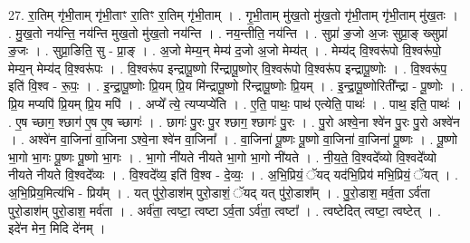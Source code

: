 \documentclass[17pt]{extarticle}
\begin{document}
27. रा॒तिम् गृ॑भी॒ताम् गृ॑भी॒ताꣳ रा॒तिꣳ रा॒तिम् गृ॑भी॒ताम् । . गृ॒भी॒ताम् मु॑ख॒तो मु॑ख॒तो गृ॑भी॒ताम् गृ॑भी॒ताम् मु॑ख॒तः । . मु॒ख॒तो नय॑न्ति॒ नय॑न्ति मुख॒तो मु॑ख॒तो नय॑न्ति । . नय॒न्तीति॒ नय॑न्ति । . सुप्रा॑ ङ॒जो अ॒जः सुप्रा॒ङ् ख्सुप्रा॑ ङ॒जः । . सुप्रा॒ङिति॒ सु - प्रा॒ङ् । . अ॒जो मेम्य॒न् मेम्य॑ द॒जो अ॒जो मेम्य॑त् । . मेम्य॑द् वि॒श्वरू॑पो वि॒श्वरू॑पो॒ मेम्य॒न् मेम्य॑द् वि॒श्वरू॑पः । . वि॒श्वरू॑प इन्द्रापू॒ष्णो रि॑न्द्रापू॒ष्णोर् वि॒श्वरू॑पो वि॒श्वरू॑प इन्द्रापू॒ष्णोः । . वि॒श्वरू॑प॒ इति॑ वि॒श्व - रू॒पः॒ । . इ॒न्द्रा॒पू॒ष्णोः प्रि॒यम् प्रि॒य मि॑न्द्रापू॒ष्णो रि॑न्द्रापू॒ष्णोः प्रि॒यम् । . इ॒न्द्रा॒पू॒ष्णोरिती᳚न्द्रा - पू॒ष्णोः । . प्रि॒य मप्यपि॑ प्रि॒यम् प्रि॒य मपि॑ । . अप्ये᳚ त्ये॒ त्यप्यप्ये॑ति । . ए॒ति॒ पाथः॒ पाथ॑ एत्येति॒ पाथः॑ । . पाथ॒ इति॒ पाथः॑ । . ए॒ष च्छाग॒ श्छाग॑ ए॒ष ए॒ष च्छागः॑ । . छागः॑ पु॒रः पु॒र श्छाग॒ श्छागः॑ पु॒रः । . पु॒रो अश्वे॒ना श्वे॑न पु॒रः पु॒रो अश्वे॑न । . अश्वे॑न वा॒जिना॑ वा॒जिना ऽश्वे॒ना श्वे॑न वा॒जिना᳚ । . वा॒जिना॑ पू॒ष्णः पू॒ष्णो वा॒जिना॑ वा॒जिना॑ पू॒ष्णः । . पू॒ष्णो भा॒गो भा॒गः पू॒ष्णः पू॒ष्णो भा॒गः । . भा॒गो नी॑यते नीयते भा॒गो भा॒गो नी॑यते । . नी॒य॒ते॒ वि॒श्वदे᳚व्यो वि॒श्वदे᳚व्यो नीयते नीयते वि॒श्वदे᳚व्यः । . वि॒श्वदे᳚व्य॒ इति॑ वि॒श्व - दे॒व्यः॒ । . अ॒भि॒प्रियं॒ ॅयद् यद॑भि॒प्रिय॑ मभि॒प्रियं॒ ॅयत् । . अ॒भि॒प्रिय॒मित्य॑भि - प्रिय᳚म् । . यत् पु॑रो॒डाश॑म् पुरो॒डाशं॒ ॅयद् यत् पु॑रो॒डाश᳚म् । . पु॒रो॒डाश॒ मर्व॒ता ऽर्व॑ता पुरो॒डाश॑म् पुरो॒डाश॒ मर्व॑ता । . अर्व॑ता॒ त्वष्टा॒ त्वष्टा ऽर्व॒ता ऽर्व॑ता॒ त्वष्टा᳚ । . त्वष्टेदित् त्वष्टा॒ त्वष्टेत् । . इदे॑न मेन॒ मिदि दे॑नम् । \newline
\end{document}
